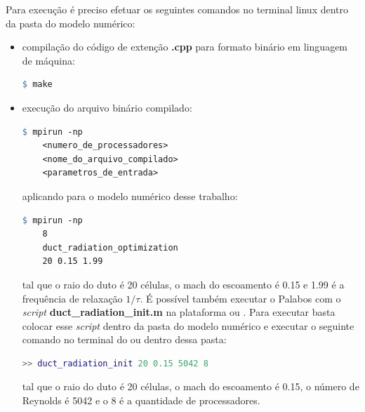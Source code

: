 Para execução é preciso efetuar os seguintes comandos no terminal linux dentro da pasta do modelo numérico:
\begin{itemize}
  \item compilação do código de extenção \textbf{.cpp} para formato binário em linguagem de máquina:
  \begin{lstlisting}[language=make, frame = single]
    $ make
  \end{lstlisting}
  \item execução do arquivo binário compilado:
  \begin{lstlisting}[language=make, frame = single]
    $ mpirun -np 
    <numero_de_processadores> 
    <nome_do_arquivo_compilado> 
    <parametros_de_entrada>
  \end{lstlisting}
  aplicando para o modelo numérico desse trabalho:
  \begin{lstlisting}[language=make, frame = single]
    $ mpirun -np 
    8
    duct_radiation_optimization
    20 0.15 1.99
  \end{lstlisting}
  tal que o raio do duto é 20 células, o mach do escoamento é 0.15 e 1.99 é a frequência de relaxação $1/\tau$. É possível também executar o Palabos com o \textit{script} \textbf{duct\_radiation\_init.m} na plataforma  ou . Para executar basta colocar esse \textit{script} dentro da pasta do modelo numérico e executar o seguinte comando no terminal do  ou  dentro dessa pasta:
  \begin{lstlisting}[language=matlab, frame = single]
    >> duct_radiation_init 20 0.15 5042 8
  \end{lstlisting}
  tal que o raio do duto é 20 células, o mach do escoamento é 0.15, o número de Reynolds é 5042 e o 8 é a quantidade de processadores.
\end{itemize}
